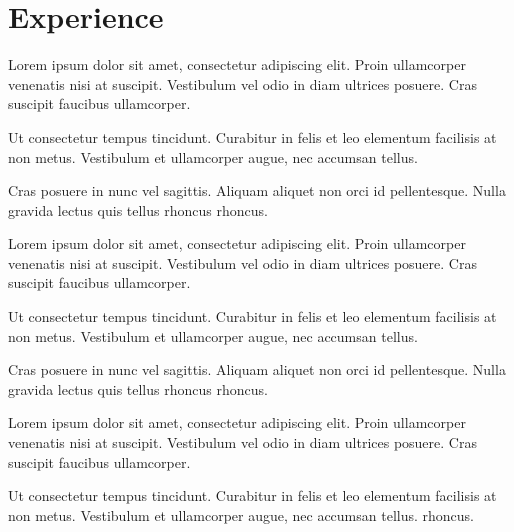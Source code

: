 \documentclass[]{plushcv}
\begin{document}
\begin{minipage}[t]{0.70\textwidth}



\section{Experience}
\vspace{\topsep} %
\begin{tightemize}
\sectionsep
\item Lorem ipsum dolor sit amet, consectetur adipiscing elit. Proin ullamcorper venenatis nisi at suscipit. Vestibulum vel odio in diam ultrices posuere. Cras suscipit faucibus ullamcorper.
\item Ut consectetur tempus tincidunt. Curabitur in felis et leo elementum facilisis at non metus. Vestibulum et ullamcorper augue, nec accumsan tellus. \item Cras posuere in nunc vel sagittis. Aliquam aliquet non orci id pellentesque. Nulla gravida lectus quis tellus rhoncus rhoncus.
\end{tightemize}
\sectionsep

\begin{tightemize}
\sectionsep
\item Lorem ipsum dolor sit amet, consectetur adipiscing elit. Proin ullamcorper venenatis nisi at suscipit. Vestibulum vel odio in diam ultrices posuere. Cras suscipit faucibus ullamcorper.
\item Ut consectetur tempus tincidunt. Curabitur in felis et leo elementum facilisis at non metus. Vestibulum et ullamcorper augue, nec accumsan tellus.
\item Cras posuere in nunc vel sagittis. Aliquam aliquet non orci id pellentesque. Nulla gravida lectus quis tellus rhoncus rhoncus.
\end{tightemize}
\sectionsep

\begin{tightemize}
\sectionsep
\item Lorem ipsum dolor sit amet, consectetur adipiscing elit. Proin ullamcorper venenatis nisi at suscipit. Vestibulum vel odio in diam ultrices posuere. Cras suscipit faucibus ullamcorper.
\item Ut consectetur tempus tincidunt. Curabitur in felis et leo elementum facilisis at non metus. Vestibulum et ullamcorper augue, nec accumsan tellus.
 rhoncus.
\end{tightemize}
\sectionsep



\end{minipage}
\end{document}
